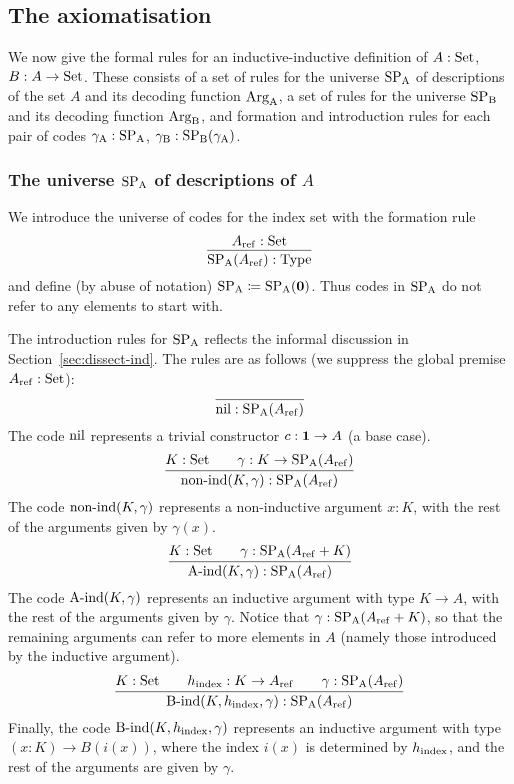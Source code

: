 \documentclass{article}
\begin{document}

\subsection{The axiomatisation}
\label{sec:formal-axiomatisation}

We now give the formal rules for an inductive-inductive definition of
$A : \text{Set}$, $B : A \to \text{Set}$. These consists of a set of rules for the
universe $\text{SP}_{\mathrm{A}}$ of descriptions of the set $A$ and its decoding
function $\text{Arg}_{\mathrm{A}}$, a set of rules for the universe $\text{SP}_{\mathrm{B}}$ and its
decoding function $\text{Arg}_{\mathrm{B}}$, and formation and introduction rules for
each pair of codes $\gamma_{\mathrm{A}} : \text{SP}_{\mathrm{A}}$, $\gamma_{\mathrm{B}} : \text{SP}_{\mathrm{B}}(\gamma_{\mathrm{A}})$.


\subsubsection{The universe $\text{SP}_{\mathrm{A}}$ of descriptions of $A$}
\label{sec:SPA}
  
We introduce the universe of codes for the index set with the
formation rule
\[
\infer{\SPA(\Aref) : \TYPE}{\Aref : \Set}
\]
and define (by abuse of notation) $\text{SP}_{\mathrm{A}} \coloneqq \text{SP}_{\mathrm{A}}(\mathbf{0})$. Thus
codes in $\text{SP}_{\mathrm{A}}$ do not refer to any elements to start with.

The introduction rules for $\text{SP}_{\mathrm{A}}$ reflects the informal discussion in
Section~\ref{sec:dissect-ind}. The rules are as follows (we suppress
the global premise $A_{\mathrm{ref}} : \text{Set}$):
\[
\infer{\nilA : \SPA(\Aref)}{}
\]
%
The code $\text{nil}$ represents a trivial constructor $c : \mathbf{1} \to A$ (a base case).
%
\[
\infer{\nonindA(K, \gamma) : \SPA(\Aref)}{K : \Set & \quad \gamma : K \to \SPA(\Aref)}
\]
%
The code $\text{non-ind}(K, \gamma)$ represents a non-inductive argument $x
: K$, with the rest of the arguments given by $\gamma(x)$.
%
\[
\infer{\AindA(K, \gamma) : \SPA(\Aref)}{K : \Set & \quad \gamma : \SPA(\Aref + K)}
\]
%
The code $\text{A-ind}(K, \gamma)$ represents an inductive argument with
type $K \to A$, with the rest of the arguments given by
$\gamma$. Notice that $\gamma : \text{SP}_{\mathrm{A}}(A_{\mathrm{ref}} + K)$, so that the
remaining arguments can refer to more elements in $A$ (namely those
introduced by the inductive argument).
%
\[
\infer{\BindA(K, \hindex, \gamma) : \SPA(\Aref)}{K : \Set & \quad \hindex : K \to \Aref & \quad \gamma : \SPA(\Aref)}
\]
%
Finally, the code $\text{B-ind}(K, h_{\mathrm{index}}, \gamma)$ represents an inductive
argument with type $(x : K) \to B(i(x))$, where the index $i(x)$ is
determined by $h_{\mathrm{index}}$, and the rest of the arguments are given by
$\gamma$.
%
\end{document}
